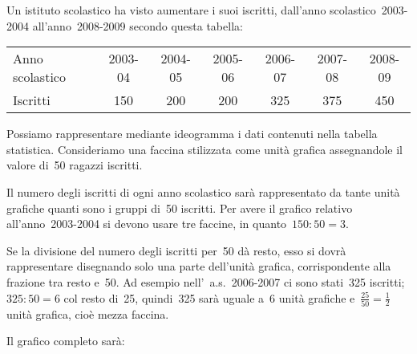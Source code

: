 \begin{esempio}
Un istituto scolastico ha visto aumentare i suoi iscritti, dall'anno 
scolastico~2003-2004 all'anno~2008-2009 secondo questa tabella:
\vspace{-6pt}

\begin{center}
 \begin{tabular}{lcccccc}
 \toprule
 Anno scolastico & 2003-04 & 2004-05 & 2005-06 & 2006-07 & 2007-08 & 
2008-09\\
 Iscritti & 150 & 200 & 200 & 325 & 375 & 450\\
 \bottomrule
\end{tabular}
\end{center}
\vspace{-6pt}

Possiamo rappresentare mediante ideogramma i dati contenuti nella tabella 
statistica.
Consideriamo una faccina stilizzata come unità grafica assegnandole il 
valore di~50 ragazzi iscritti.
\vspace{-6pt}
\begin{center}
 
\end{center}
\vspace{-6pt}
Il numero degli iscritti di ogni anno scolastico sarà rappresentato da 
tante unità grafiche quanti sono i gruppi di~50 iscritti.
Per avere il grafico relativo all'anno~2003-2004 si devono usare tre 
faccine, in quanto~$150: 50 = 3$.
\vspace{-6pt}
\begin{center}
 
\end{center}
\vspace{-6pt}
Se la divisione del numero degli iscritti per~50 dà resto, esso si dovrà 
rappresentare disegnando solo una parte
dell'unità grafica, corrispondente alla frazione tra resto e~50. Ad esempio 
nell'~a.s.~2006-2007 ci sono stati~325 iscritti; $325:50 = 6$
col resto di~25, quindi~325 sarà uguale a~6 unità grafiche 
e~$\frac{25}{50}=\frac{1}{2}$ unità grafica, cioè mezza faccina.
\vspace{-6pt}
\begin{center}
 
\end{center}
\vspace{-6pt}
Il grafico completo sarà:
\begin{center}
 
\end{center}
 \end{esempio}

